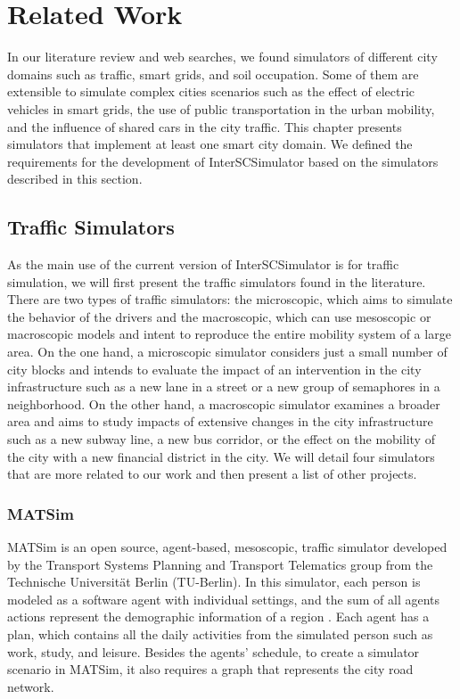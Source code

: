 \chapter{Related Work}
\label{cap:relacionados}

In our literature review and web searches, we found simulators of different city domains such as traffic, smart grids, and soil occupation. Some of them are extensible to simulate complex cities scenarios such as the effect of electric vehicles in smart grids, the use of public transportation in the urban mobility, and the influence of shared cars in the city traffic. This chapter presents simulators that implement at least one smart city domain. We defined the requirements for the development of InterSCSimulator based on the simulators described in this section.

\section{Traffic Simulators}
\label{sec:rel_transito}

As the main use of the current version of InterSCSimulator is for traffic simulation, we will first present the traffic simulators found in the literature. There are two types of traffic simulators: the microscopic, which aims to simulate the behavior of the drivers and the macroscopic, which can use mesoscopic or macroscopic models and intent to reproduce the entire mobility system of a large area. On the one hand, a microscopic simulator considers just a small number of city blocks and intends to evaluate the impact of an intervention in the city infrastructure such as a new lane in a street or a new group of semaphores in a neighborhood. On the other hand, a macroscopic simulator examines a broader area and aims to study impacts of extensive changes in the city infrastructure such as a new subway line, a new bus corridor, or the effect on the mobility of the city with a new financial district in the city. We will detail four simulators that are more related to our work and then present a list of other projects.

\subsection{MATSim}

MATSim is an open source, agent-based, mesoscopic, traffic simulator \citep{horni2016multi} developed by the Transport Systems Planning and Transport Telematics group from the Technische Universität Berlin (TU-Berlin). In this simulator, each person is modeled as a software agent with individual settings, and the sum of all agents actions represent the demographic information of a region \citep{balmer2008agent}. Each agent has a plan, which contains all the daily activities from the simulated person such as work, study, and leisure. Besides the agents' schedule, to create a simulator scenario in MATSim, it also requires a graph that represents the city road network. 

